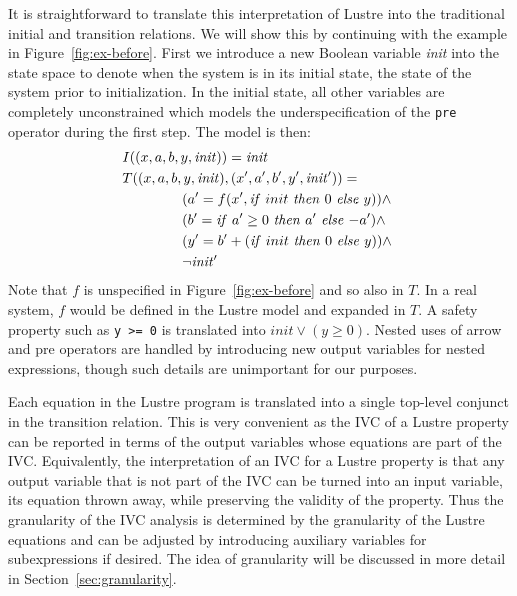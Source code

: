 It is straightforward to translate this interpretation of Lustre into
the traditional initial and transition relations. We will show this by
continuing with the example in Figure~\ref{fig:ex-before}. First we
introduce a new Boolean variable \textit{init} into the state space to denote
when the system is in its initial state, the state of the system prior
to initialization. In the initial state, all other variables are
completely unconstrained which models the underspecification of the \texttt{pre}
operator during the first step. The model is then:
\begin{align*}
  &I((x, a, b, y, \mathit{init})) = \mathit{init} \\
  &T((x, a, b, y, \mathit{init}), (x', a', b', y', \mathit{init'})) = \\
  &\hspace{1.5cm} (a' = f(x', \mathit{if}\ {init}\ \mathit{then}\ {0}\ \mathit{else}\ {y})) \land~ \\
  &\hspace{1.5cm} (b' = \mathit{if}\ {a' \geq 0}\ \mathit{then}\ {a'}\ \mathit{else}\ {-a'}) \land~ \\
  &\hspace{1.5cm} (y' = b' + (\mathit{if}\ {init}\ \mathit{then}\ {0}\ \mathit{else}\ {y})) \land ~\\
  &\hspace{1.5cm} \neg\mathit{init'}
\end{align*}
Note that $f$ is unspecified in Figure~\ref{fig:ex-before} and so also
in $T$. In a real system, $f$ would be defined in the Lustre model and
expanded in $T$. A safety property such as {\tt y >= 0} is translated
into $\mathit{init} \lor (y \geq 0)$. Nested uses of arrow and pre
operators are handled by introducing new output variables for nested
expressions, though such details are unimportant for our purposes.

Each equation in the Lustre program is translated into a single
top-level conjunct in the transition relation. This is very convenient
as the IVC of a Lustre property can be reported in terms of the output
variables whose equations are part of the IVC. Equivalently, the
interpretation of an IVC for a Lustre property is that any output
variable that is not part of the IVC can be turned into an input
variable, its equation thrown away, while preserving the validity of
the property. Thus the granularity of the IVC analysis is determined
by the granularity of the Lustre equations and can be adjusted by
introducing auxiliary variables for subexpressions if desired.  The idea of granularity will be discussed in more detail in Section~\ref{sec:granularity}.

